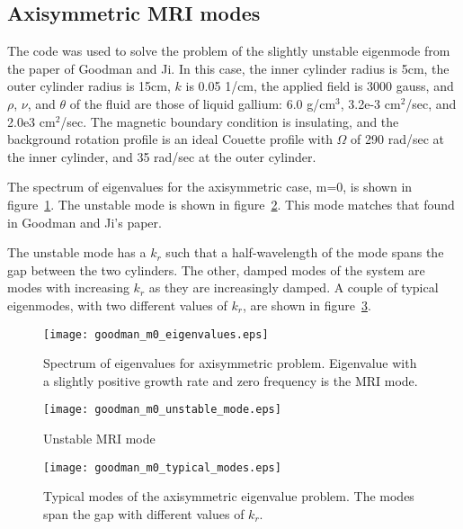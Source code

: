 \documentclass[letterpaper]{article}
\begin{document}
\subsection{Axisymmetric MRI modes}

The code was used to solve the problem of the slightly unstable
eigenmode from the paper of Goodman and Ji.  In this case, the inner
cylinder radius is 5cm, the outer cylinder radius is 15cm, $k$ is 0.05
1/cm, the applied field is 3000 gauss, and $\rho$, $\nu$, and $\theta$
of the fluid are those of liquid gallium: 6.0 g/cm$^3$, 3.2e-3
cm$^2$/sec, and 2.0e3 cm$^2$/sec.  The magnetic boundary condition is
insulating, and the background rotation profile is an ideal Couette
profile with $\Omega$ of 290 rad/sec at the inner cylinder, and 35
rad/sec at the outer cylinder.

The spectrum of eigenvalues for the axisymmetric case, m=0, is shown
in figure~\ref{fig:goodmanm0eigenvalues}.  The unstable mode is shown
in figure~\ref{fig:goodmanm0unstablemode}.  This mode matches that
found in Goodman and Ji's paper.

The unstable mode has a $k_r$ such that a half-wavelength of the mode
spans the gap between the two cylinders.  The other, damped modes of
the system are modes with increasing $k_r$ as they are increasingly
damped.  A couple of typical eigenmodes, with two different values of
$k_r$, are shown in figure~\ref{fig:goodmanm0typicalmodes}.

\begin{figure}
\begin{center}
\texttt{[image: goodman\_m0\_eigenvalues.eps]}
\caption{Spectrum of eigenvalues for axisymmetric problem.  Eigenvalue
  with a slightly positive growth rate and zero frequency is the MRI
  mode.}
\label{fig:goodmanm0eigenvalues}
\end{center}
\end{figure}


\begin{figure}
\begin{center}
\texttt{[image: goodman\_m0\_unstable\_mode.eps]}
\caption{Unstable MRI mode}
\label{fig:goodmanm0unstablemode}
\end{center}
\end{figure}

\begin{figure}
\begin{center}
\texttt{[image: goodman\_m0\_typical\_modes.eps]}
\caption{Typical modes of the axisymmetric eigenvalue problem.  The
  modes span the gap with different values of $k_r$.}
\label{fig:goodmanm0typicalmodes}
\end{center}
\end{figure}
\end{document}
